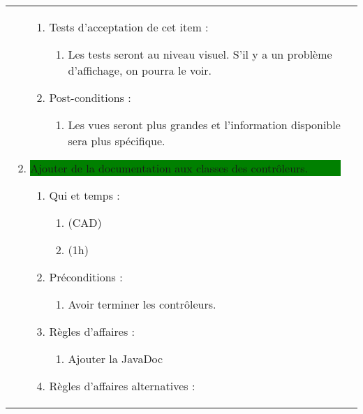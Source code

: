 \begin{longtable}{|l|p{}|}
\begin{enumerate}[label*=\arabic*.]
\begin{enumerate}[label*=\arabic*.]
                                \item Tests d'acceptation de cet item :
                                \begin{enumerate}[label*=\arabic*.]
                                    \item Les tests seront au niveau visuel. S'il y a un problème d'affichage, on pourra le voir.
                                \end{enumerate}
                                \item Post-conditions :
                                \begin{enumerate}[label*=\arabic*.]
                                    \item Les vues seront plus grandes et l'information disponible sera plus spécifique.
                                \end{enumerate}
                            \end{enumerate}
             \item  \colorbox{Green}{\parbox{13cm}{ Ajouter de la documentation aux classes des contrôleurs.}}
                \begin{enumerate}[label*=\arabic*.]
                                \item Qui et temps :
                                \begin{enumerate}[label*=\arabic*.]
                                    \item (CAD)
                                    \item (1h)
                                \end{enumerate}
                                \item Préconditions :
                                \begin{enumerate}[label*=\arabic*.]
                                    \item Avoir terminer les contrôleurs.
                                \end{enumerate}
                                \item Règles d'affaires :
                                \begin{enumerate}[label*=\arabic*.]
                                    \item Ajouter la JavaDoc
                                \end{enumerate}
                                \item Règles d'affaires alternatives :

\end{enumerate}
\end{enumerate}
\end{longtable}
